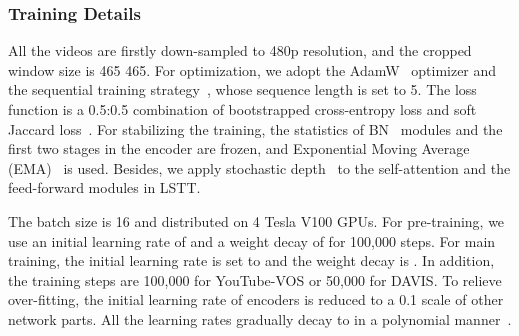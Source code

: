 \documentclass{article}
\begin{document}
\subsubsection{Training Details}
All the videos are firstly down-sampled to 480p resolution, and the cropped window size is 465 465. For optimization, we adopt the AdamW~\cite{adamw} optimizer and the sequential training strategy~\cite{cfbi}, whose sequence length is set to 5. The loss function is a 0.5:0.5 combination of bootstrapped cross-entropy loss and soft Jaccard loss~\cite{nowozin2014optimal}. For stabilizing the training, the statistics of BN~\cite{bn} modules and the first two stages in the encoder are frozen, and Exponential Moving Average (EMA)~\cite{polyak1992acceleration} is used. Besides, we apply stochastic depth~\cite{huang2016deep} to the self-attention and the feed-forward modules in LSTT.

The batch size is 16 and distributed on 4 Tesla V100 GPUs. For pre-training, we use an initial learning rate of  and a weight decay of  for 100,000 steps. For main training, the initial learning rate is set to  and the weight decay is . In addition, the training steps are 100,000 for YouTube-VOS or 50,000 for DAVIS. To relieve over-fitting, the initial learning rate of encoders is reduced to a 0.1 scale of other network parts. All the learning rates gradually decay to  in a polynomial manner~\cite{cfbi}.
\end{document}
